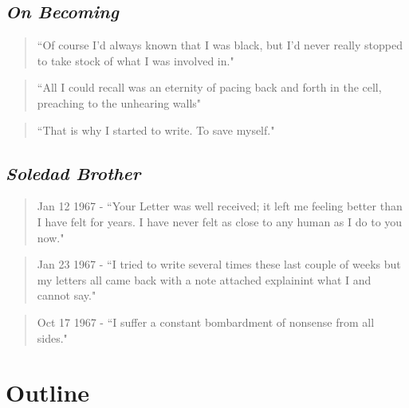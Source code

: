 \documentclass[14pt, letterpaper]{report}
\begin{document}
	\subsection*{\textit{On Becoming}}
	
	\begin{quote}
	``Of course I'd always known that I was black, but I'd never really 
	stopped to take stock of what I was involved in."\autocite[3]{soul-on-ice}
	\end{quote}		
	
	\begin{quote}
	``All I could recall was an eternity of pacing back and forth in 
	the cell, preaching to the unhearing walls"\autocite[11]{soul-on-ice}
	\end{quote}
	
	\begin{quote}
	``That is why I started to write. To save myself."\autocite[15]{soul-on-ice}
	\end{quote}
	
	\subsection*{\textit{Soledad Brother}}
	
	\begin{quote}
	Jan 12 1967 - ``Your Letter was well received; it left me feeling better 
	than I have felt for years. I have never felt as close to any human as I 
	do to you now."\autocite[99]{soledad-brother}
	\end{quote}
	
	\begin{quote}
	Jan 23 1967 - ``I tried to write several times these last couple of weeks 
	but my letters all came back with a note attached explainint what I and 
	cannot say."\autocite[101]{soledad-brother}
	\end{quote}

	\begin{quote}
	Oct 17 1967 - ``I suffer a constant bombardment of nonsense from all 
	sides."\autocite[139]{soledad-brother}
	\end{quote}
	
    \section*{Outline}
	
\end{document}
